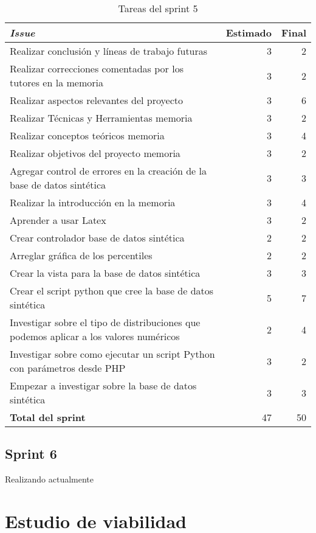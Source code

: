\begin{table}[H]
	 \begin{tabularx}{\linewidth}{X r r}
	 	\toprule \textbf{\textit{Issue}} & \textbf{Estimado} & \textbf{Final}\\
	 	\toprule
        Realizar conclusión y líneas de trabajo futuras & 3 & 2 \\
        Realizar correcciones comentadas por los tutores en la memoria & 3 & 2  \\
        Realizar aspectos relevantes del proyecto & 3 & 6 \\
        Realizar Técnicas y Herramientas memoria & 3 & 2 \\
        Realizar conceptos teóricos memoria & 3 & 4 \\
        Realizar objetivos del proyecto memoria & 3 & 2 \\
        Agregar control de errores en la creación de la base de datos sintética & 3 & 3 \\
        Realizar la introducción en la memoria & 3 & 4 \\
        Aprender a usar Latex & 3 & 2 \\
        Crear controlador base de datos sintética & 2 & 2 \\
        Arreglar gráfica de los percentiles & 2 & 2 \\
        Crear la vista para la base de datos sintética & 3 & 3 \\
        Crear el script python que cree la base de datos sintética & 5 & 7 \\
        Investigar sobre el tipo de distribuciones que podemos aplicar a los valores numéricos & 2 & 4 \\
        Investigar sobre como ejecutar un script Python con parámetros desde PHP & 3 & 2 \\
        Empezar a investigar sobre la base de datos sintética & 3 & 3 \\
        \midrule
	    \textbf{Total del sprint} & 47 & 50 \\
	 	\bottomrule
	 \end{tabularx}
	 \caption{Tareas del sprint 5}
\end{table}

\subsection{Sprint 6}

Realizando actualmente

\section{Estudio de viabilidad}

